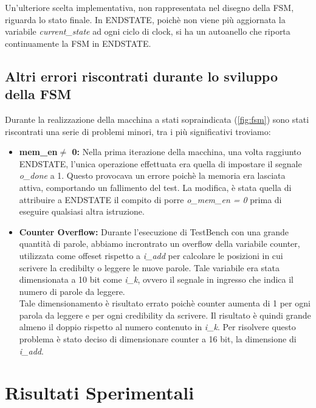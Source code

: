 \documentclass[12pt]{article}
\begin{document}
Un'ulteriore scelta implementativa, non rappresentata nel disegno della FSM, riguarda lo stato finale. In ENDSTATE, poichè non viene più aggiornata la variabile \textit{current\_state} ad ogni ciclo di clock, si ha un autoanello che riporta continuamente la FSM in ENDSTATE.

\subsection{Altri errori riscontrati durante lo sviluppo della FSM}
Durante la realizzazione della macchina a stati sopraindicata (\ref{fig:fsm}) sono stati riscontrati una serie di problemi minori, tra i più significativi troviamo:
\begin{itemize}
    \item \textbf{mem\_en\(\ne\) 0:} Nella prima iterazione della macchina, una volta raggiunto ENDSTATE, l'unica operazione effettuata era quella di impostare il segnale \textit{o\_done} a 1. Questo provocava un errore poichè la memoria era lasciata attiva, comportando un fallimento del test. La modifica, è stata quella di attribuire a ENDSTATE il compito di porre \textit{o\_mem\_en = 0} prima di eseguire qualsiasi altra istruzione.
    \item \textbf{Counter Overflow:} Durante l'esecuzione di TestBench con una grande quantità di parole, abbiamo incrontrato un overflow della variabile counter, utilizzata come offeset rispetto a \textit{i\_add} per calcolare le posizioni in cui scrivere la credibilty o leggere le nuove parole. Tale variabile era stata dimensionata a 10 bit come \textit{i\_k}, ovvero il segnale in ingresso che indica il numero di parole da leggere.\\
    Tale dimensionamento è risultato errato poichè counter aumenta di 1 per ogni parola da leggere e per ogni credibility da scrivere. Il risultato è quindi grande almeno il doppio rispetto al numero contenuto in \textit{i\_k}. Per risolvere questo problema è stato deciso di dimensionare counter a 16 bit, la dimensione di \textit{i\_add}.
\end{itemize}
\newpage

\section{Risultati Sperimentali}\label{Risultati Sperimentali}
\end{document}
